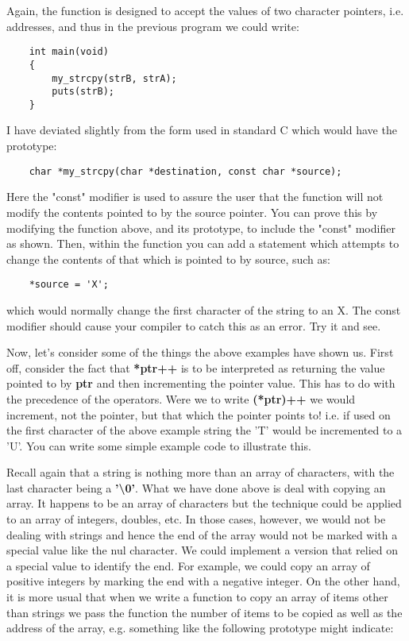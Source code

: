 Again, the function is designed to accept the values of two character
pointers, i.e. addresses, and thus in the previous program we could
write:

\begin{verbatim}
    int main(void)
    {
        my_strcpy(strB, strA);
        puts(strB);
    }    
\end{verbatim}

I have deviated slightly from the form used in standard C which would
have the prototype:

\begin{verbatim}
    char *my_strcpy(char *destination, const char *source);  
\end{verbatim}

Here the "const" modifier is used to assure the user that the function
will not modify the contents pointed to by the source pointer. You can
prove this by modifying the function above, and its prototype, to
include the "const" modifier as shown. Then, within the function you can
add a statement which attempts to change the contents of that which is
pointed to by source, such as:

\begin{verbatim}
    *source = 'X';
\end{verbatim}

which would normally change the first character of the string to an X.
The const modifier should cause your compiler to catch this as an error.
Try it and see.

Now, let's consider some of the things the above examples have shown us.
First off, consider the fact that \textbf{*ptr++} is to be interpreted
as returning the value pointed to by \textbf{ptr} and then incrementing
the pointer value. This has to do with the precedence of the operators.
Were we to write \textbf{(*ptr)++} we would increment, not the pointer,
but that which the pointer points to! i.e. if used on the first
character of the above example string the 'T' would be incremented to a
'U'. You can write some simple example code to illustrate this.

Recall again that a string is nothing more than an array of characters,
with the last character being a \textbf{'\textbackslash0'}. What we have
done above is deal with copying an array. It happens to be an array of
characters but the technique could be applied to an array of integers,
doubles, etc. In those cases, however, we would not be dealing with
strings and hence the end of the array would not be marked with a
special value like the nul character. We could implement a version that
relied on a special value to identify the end. For example, we could
copy an array of positive integers by marking the end with a negative
integer. On the other hand, it is more usual that when we write a
function to copy an array of items other than strings we pass the
function the number of items to be copied as well as the address of the
array, e.g. something like the following prototype might indicate:

